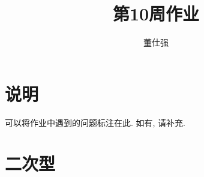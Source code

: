 \documentclass[11pt]{ctexart}
\title{第10周作业}
\author{董仕强}
\theoremstyle{definition}
\newtheorem{qqq}{问题}[section]
\numberwithin{equation}{section}
\newcommand{\FF}{\mathbb{F}}%
\begin{document}
\maketitle

\section{说明}

可以将作业中遇到的问题标注在此. 如有, 请补充.\\


\tableofcontents

\newpage



    

\section{二次型}
\end{document}
